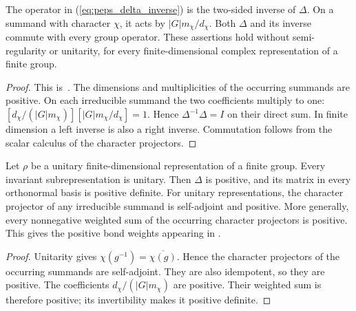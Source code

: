 \begin{lemma}
    \label{thm:peps_delta_inverse}
    \leanok
    The operator in (\ref{eq:peps_delta_inverse}) is the two-sided inverse
    of $\Delta$. On a summand with character $\chi$, it acts by
    $|G|m_\chi/d_\chi$. Both $\Delta$ and its inverse commute with every
    group operator. These assertions hold without semi-regularity or
    unitarity, for every finite-dimensional complex representation of a
    finite group.
\end{lemma}
\begin{proof}\leanok
    This is~\cite[``Invertibility of $\Delta$'']{QICLean2026Blueprint}.
    The dimensions and multiplicities of the occurring summands are
    positive. On each irreducible summand the two coefficients multiply
    to one:
    $[d_\chi/(|G|m_\chi)][|G|m_\chi/d_\chi]=1$.
    Hence $\Delta^{-1}\Delta=I$ on their direct sum. In finite dimension
    a left inverse is also a right inverse. Commutation follows from
    the scalar calculus of the character projectors.
\end{proof}

\begin{lemma}
    \label{thm:peps_delta_positive}
    \leanok
    Let $\rho$ be a unitary finite-dimensional representation of a finite
    group. Every invariant subrepresentation is unitary. Then $\Delta$ is positive, and its matrix in every orthonormal
    basis is positive definite. For unitary representations, the character
    projector of any irreducible summand is self-adjoint and positive.
    More generally, every nonnegative weighted sum of the occurring
    character projectors is positive. This gives the positive bond weights
    appearing in \cite[Lemma~4.4]{Schuch2010PEPS}.
\end{lemma}
\begin{proof}\leanok
    Unitarity gives $\chi(g^{-1})=\overline{\chi(g)}$. Hence the character
    projectors of the occurring summands are self-adjoint. They are also
    idempotent, so they are positive. The coefficients
    $d_\chi/(|G|m_\chi)$ are positive. Their weighted sum is therefore
    positive; its invertibility makes it positive definite.
\end{proof}
